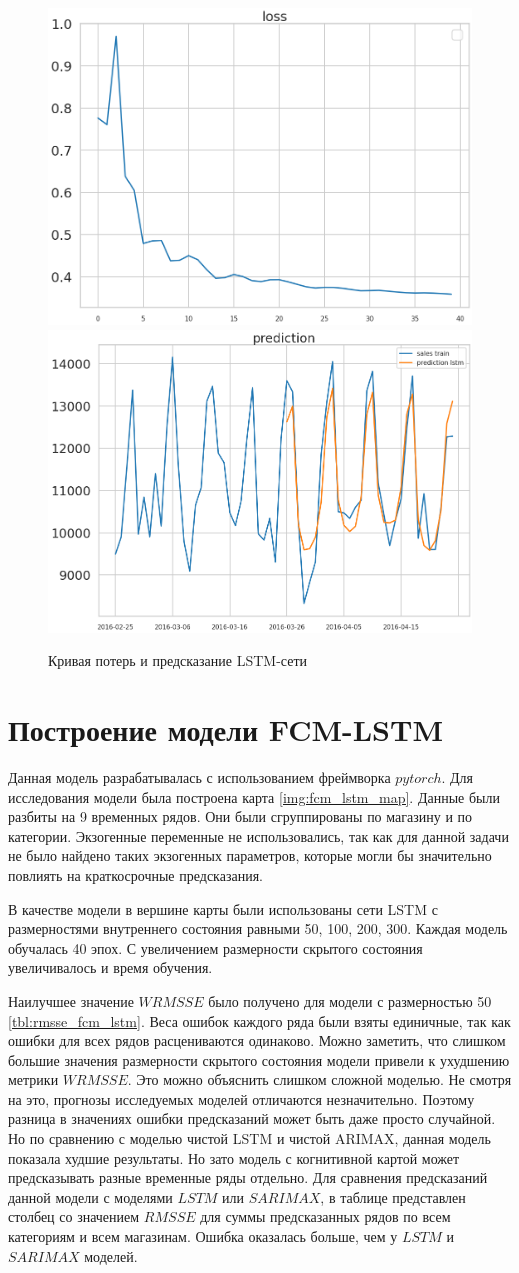 \def\figurename{Рис}
\begin{figure}[t]
	\centering
	\includegraphics[width=0.4\columnwidth]{./img/lstm_loss.png}
	\includegraphics[width=0.4\columnwidth]{./img/lstm_prediction.png}
	\caption{Кривая потерь и предсказание LSTM-сети}
	\label{img:lstm_forecast}
\end{figure}

\section{Построение модели FCM-LSTM}

Данная модель разрабатывалась с использованием фреймворка $ pytorch $.
Для исследования модели была построена карта \ref{img:fcm_lstm_map}.
Данные были разбиты на 9 временных рядов. Они были сгруппированы по
магазину и по категории. Экзогенные переменные не использовались,
так как для данной задачи не было найдено таких экзогенных параметров,
которые могли бы значительно повлиять на краткосрочные предсказания.

В качестве модели в вершине карты были использованы сети LSTM с размерностями
внутреннего состояния равными 50, 100, 200, 300. Каждая модель обучалась 40 эпох.
С увеличением размерности скрытого состояния увеличивалось и время обучения.

Наилучшее значение $ WRMSSE $ было получено для модели с размерностью 50 \ref{tbl:rmsse_fcm_lstm}.
Веса ошибок каждого ряда были взяты единичные, так как ошибки для всех рядов расцениваются одинаково.
Можно заметить, что слишком большие значения размерности скрытого состояния модели
привели к ухудшению метрики $ WRMSSE $. Это можно объяснить слишком сложной моделью.
Не смотря на это, прогнозы исследуемых моделей отличаются незначительно.
Поэтому разница в значениях ошибки предсказаний может быть даже просто случайной.
Но по сравнению с моделью чистой LSTM и чистой ARIMAX, данная модель показала худшие результаты.
Но зато модель с когнитивной картой может предсказывать разные временные ряды отдельно.
Для сравнения предсказаний данной модели с моделями $ LSTM $ или $ SARIMAX $, в
таблице представлен столбец со значением $ RMSSE $ для суммы предсказанных рядов
по всем категориям и всем магазинам. Ошибка оказалась больше, чем у  $ LSTM $ и $ SARIMAX $
моделей.

